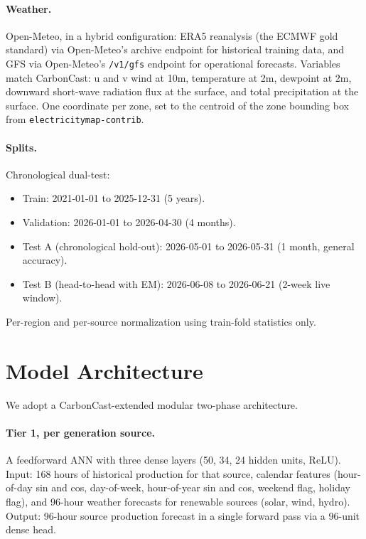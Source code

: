 \documentclass[sigconf,nonacm]{acmart}
\begin{document}
\paragraph{Weather.} Open-Meteo, in a hybrid configuration: ERA5 reanalysis (the ECMWF gold standard) via Open-Meteo's archive endpoint for historical training data, and GFS via Open-Meteo's \texttt{/v1/gfs} endpoint for operational forecasts. Variables match CarbonCast: u and v wind at 10m, temperature at 2m, dewpoint at 2m, downward short-wave radiation flux at the surface, and total precipitation at the surface. One coordinate per zone, set to the centroid of the zone bounding box from \texttt{electricitymap-contrib}.

\paragraph{Splits.} Chronological dual-test:
\begin{itemize}
    \item Train: 2021-01-01 to 2025-12-31 (5 years).
    \item Validation: 2026-01-01 to 2026-04-30 (4 months).
    \item Test A (chronological hold-out): 2026-05-01 to 2026-05-31 (1 month, general accuracy).
    \item Test B (head-to-head with EM): 2026-06-08 to 2026-06-21 (2-week live window).
\end{itemize}

Per-region and per-source normalization using train-fold statistics only.

\section{Model Architecture}

We adopt a CarbonCast-extended modular two-phase architecture.

\paragraph{Tier 1, per generation source.} A feedforward ANN with three dense layers (50, 34, 24 hidden units, ReLU). Input: 168 hours of historical production for that source, calendar features (hour-of-day sin and cos, day-of-week, hour-of-year sin and cos, weekend flag, holiday flag), and 96-hour weather forecasts for renewable sources (solar, wind, hydro). Output: 96-hour source production forecast in a single forward pass via a 96-unit dense head.
\end{document}
